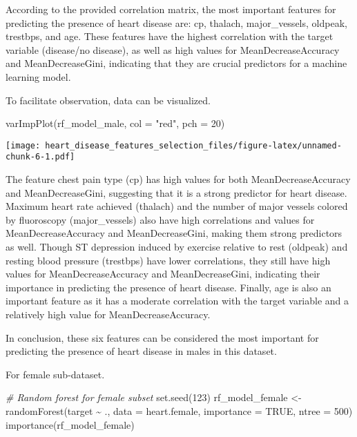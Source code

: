 \documentclass[
]{article}
\newenvironment{Shaded}{\begin{snugshade}}{\end{snugshade}}
\newcommand{\AttributeTok}[1]{\textcolor[rgb]{0.77,0.63,0.00}{#1}}
\newcommand{\CommentTok}[1]{\textcolor[rgb]{0.56,0.35,0.01}{\textit{#1}}}
\newcommand{\ConstantTok}[1]{\textcolor[rgb]{0.00,0.00,0.00}{#1}}
\newcommand{\DecValTok}[1]{\textcolor[rgb]{0.00,0.00,0.81}{#1}}
\newcommand{\FunctionTok}[1]{\textcolor[rgb]{0.00,0.00,0.00}{#1}}
\newcommand{\NormalTok}[1]{#1}
\newcommand{\OtherTok}[1]{\textcolor[rgb]{0.56,0.35,0.01}{#1}}
\newcommand{\SpecialCharTok}[1]{\textcolor[rgb]{0.00,0.00,0.00}{#1}}
\newcommand{\StringTok}[1]{\textcolor[rgb]{0.31,0.60,0.02}{#1}}
\begin{document}
According to the provided correlation matrix, the most important
features for predicting the presence of heart disease are: cp, thalach,
major\_vessels, oldpeak, trestbps, and age. These features have the
highest correlation with the target variable (disease/no disease), as
well as high values for MeanDecreaseAccuracy and MeanDecreaseGini,
indicating that they are crucial predictors for a machine learning
model.

To facilitate observation, data can be visualized.

\begin{Shaded}
\begin{Highlighting}[]
\FunctionTok{varImpPlot}\NormalTok{(rf\_model\_male, }\AttributeTok{col =} \StringTok{"red"}\NormalTok{, }\AttributeTok{pch =} \DecValTok{20}\NormalTok{)}
\end{Highlighting}
\end{Shaded}

\texttt{[image: heart\_disease\_features\_selection\_files/figure-latex/unnamed-chunk-6-1.pdf]}

The feature chest pain type (cp) has high values for both
MeanDecreaseAccuracy and MeanDecreaseGini, suggesting that it is a
strong predictor for heart disease. Maximum heart rate achieved
(thalach) and the number of major vessels colored by fluoroscopy
(major\_vessels) also have high correlations and values for
MeanDecreaseAccuracy and MeanDecreaseGini, making them strong predictors
as well. Though ST depression induced by exercise relative to rest
(oldpeak) and resting blood pressure (trestbps) have lower correlations,
they still have high values for MeanDecreaseAccuracy and
MeanDecreaseGini, indicating their importance in predicting the presence
of heart disease. Finally, age is also an important feature as it has a
moderate correlation with the target variable and a relatively high
value for MeanDecreaseAccuracy.

In conclusion, these six features can be considered the most important
for predicting the presence of heart disease in males in this dataset.

For female sub-dataset.

\begin{Shaded}
\begin{Highlighting}[]
\CommentTok{\# Random forest for female subset}
\FunctionTok{set.seed}\NormalTok{(}\DecValTok{123}\NormalTok{)}
\NormalTok{rf\_model\_female }\OtherTok{\textless{}{-}} \FunctionTok{randomForest}\NormalTok{(target }\SpecialCharTok{\textasciitilde{}}\NormalTok{ ., }\AttributeTok{data =}\NormalTok{ heart.female, }\AttributeTok{importance =} \ConstantTok{TRUE}\NormalTok{, }\AttributeTok{ntree =} \DecValTok{500}\NormalTok{)}
\FunctionTok{importance}\NormalTok{(rf\_model\_female)}
\end{Highlighting}
\end{Shaded}
\end{document}
